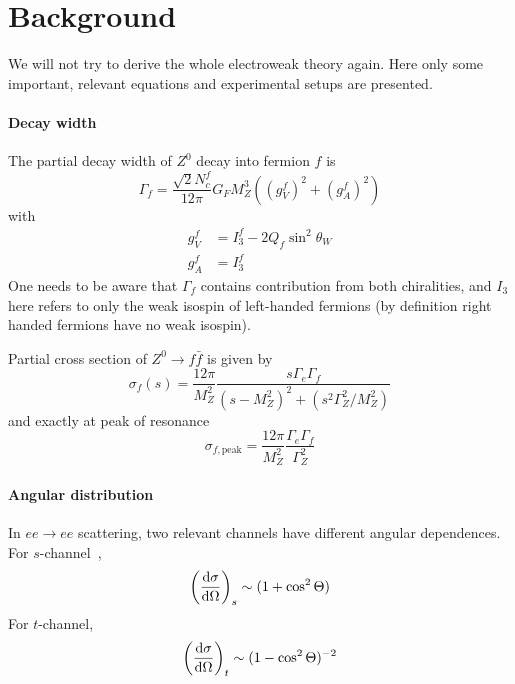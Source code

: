 \section{Background}
We will not try to derive the whole electroweak theory again. Here only some important, relevant equations and experimental setups are presented.

\paragraph{Decay width}
The partial decay width of $Z^0$ decay into fermion $f$ is~\cite{manual}
\begin{equation}
	\Gamma_f = \frac{ \sqrt{2} N_c^f}{12\pi} G_F M_Z^3 \left( (g_V^f)^2 + (g_A^f)^2  \right)
	\label{math:Gammaf}
\end{equation}
with
\begin{align*}
	g_V^f &= I_3^f - 2 Q_f \sin^2 \theta_W \\
	g_A^f &= I_3^f 
\end{align*}
One needs to be aware that $\Gamma_f$ contains contribution from both chiralities, and $I_3$ here refers to only the weak isospin of left-handed fermions (by definition right handed fermions have no weak isospin).

Partial cross section of $Z^0 \rightarrow f\bar{f}$ is given by~\cite{manual}
\begin{equation}
	\sigma_f(s) = \frac{12 \pi}{M_Z^2} \frac{s \Gamma_e \Gamma_f}{ (s-M_Z^2)^2 + (s^2 \Gamma^2_Z / M_Z^2)}
	\label{math:sigmaf}
\end{equation}
and exactly at peak of resonance
\begin{equation}
	\sigma_{f, \text{peak}} = \frac{12 \pi}{M_Z^2} \frac{\Gamma_e \Gamma_f}{\Gamma_Z^2}
	\label{math:sigmafPeak}
\end{equation}

\paragraph{Angular distribution}
In $ee \rightarrow ee$ scattering, two relevant channels have different angular dependences. For $s$-channel~\cite{manual},
\begin{equation}
	\left(\dv{\sigma}{\Omega}\right)_s \sim (1 + \cos^2 \Theta)
	\label{math:diffCrossS}
\end{equation}
For $t$-channel,
\begin{equation}
	\left(\dv{\sigma}{\Omega}\right)_t \sim (1-\cos^2 \Theta)^{-2}
	\label{math:diffCrossT}
\end{equation}


